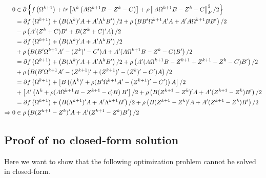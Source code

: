 \documentclass[11pt,]{report}
\theoremstyle{definition}
\theoremstyle{definition}
\theoremstyle{definition}
\theoremstyle{remark}
\begin{document}
\begin{equation}
\begin{split}
  0 &\in \partial \left\{ f\left(\Omega^{k + 1}\right) + tr\left[ \Lambda^{k}\left( A\Omega^{k + 1}B - Z^{k} - C \right) \right] + \rho\left\| A\Omega^{k + 1}B - Z^{k} - C \right\|_{F}^{2}/2 \right\} \\
  &= \partial f\left(\Omega^{k + 1} \right) + \left(B(\Lambda^{k})'A + A'\Lambda^{k}B' \right)/2 + \rho\left( BB'\Omega^{k + 1}A'A + A'A\Omega^{k + 1}BB' \right)/2 \\
  &- \rho\left( A'(Z^{k} + C)B' + B(Z^{k} + C)'A \right)/2 \\
  &= \partial f\left(\Omega^{k + 1} \right) + \left(B(\Lambda^{k})'A + A'\Lambda^{k}B' \right)/2 \\
  &+ \rho\left( B(B'\Omega^{k + 1}A' - (Z^{k})' - C')A + A'(A\Omega^{k + 1}B - Z^{k} - C)B' \right)/2 \\
  &= \partial f\left(\Omega^{k + 1} \right) + \left( B(\Lambda^{k})'A + A'\Lambda^{k}B' \right)/2 + \rho\left(A'(A\Omega^{k + 1}B - Z^{k + 1} + Z^{k + 1} - Z^{k} - C)B' \right)/2 \\
  &+ \rho\left(B(B'\Omega^{k + 1}A' - (Z^{k + 1})' + (Z^{k + 1})' - (Z^{k})' - C')A \right)/2 \\
  &= \partial f\left(\Omega^{k + 1} \right) + \left[ B\left((\Lambda^{k})' + \rho(B'\Omega^{k + 1}A' - (Z^{k + 1})' - C') \right)A \right]/2 \\
  &+ \left[ A'\left(\Lambda^{k} + \rho(A\Omega^{k + 1}B - Z^{k + 1} - c)B \right)B' \right]/2 + \rho\left(B(Z^{k + 1} - Z^{k})'A + A'(Z^{k + 1} - Z^{k})B' \right)/2 \\
  &= \partial f\left(\Omega^{k + 1} \right) + \left(B(\Lambda^{k + 1})'A + A'\Lambda^{k + 1}B' \right)/2 + \rho\left(B(Z^{k + 1} - Z^{k})'A + A'(Z^{k + 1} - Z^{k})B' \right)/2 \\
  \Rightarrow 0 &\in \rho\left( B(Z^{k + 1} - Z^{k})'A + A'(Z^{k + 1} - Z^{k})B' \right)/2
\label{eq:appendixstopproof}\notag
\end{split}
\end{equation}

\hypertarget{proofpenregression}{%
\subsection{Proof of no closed-form solution}\label{proofpenregression}}

Here we want to show that the following optimization problem cannot be solved in closed-form.
\end{document}
